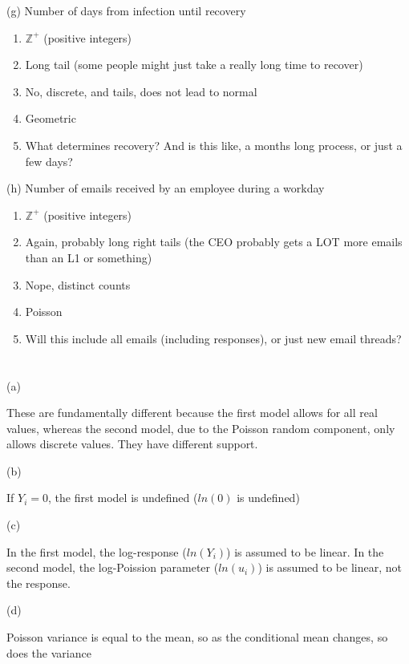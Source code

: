 \documentclass{article}
\begin{document}
(g) Number of days from infection until recovery

\begin{enumerate}
    \item $\mathbb{Z}^{+}$ (positive integers)
    \item Long tail (some people might just take a really long time to recover)
    \item No, discrete, and tails, does not lead to normal
    \item Geometric
    \item What determines recovery? And is this like, a months long process, or just a few days?
\end{enumerate}

(h) Number of emails received by an employee during a workday

\begin{enumerate}
    \item $\mathbb{Z}^{+}$ (positive integers)
    \item Again, probably long right tails (the CEO probably gets a LOT more emails than an L1 or something)
    \item Nope, distinct counts
    \item Poisson
    \item Will this include all emails (including responses), or just new email threads?
\end{enumerate}


\section{}

(a)

These are fundamentally different because the first model allows for all real values, whereas the second model, due to the Poisson random component, only allows discrete values. They have different support.

(b)

If $Y_i = 0$, the first model is undefined ($ln(0)$ is undefined)

(c)

In the first model, the log-response ($ln(Y_i)$) is assumed to be linear. In the second model, the log-Poission parameter ($ln(u_i)$) is assumed to be linear, not the response. 

(d)

Poisson variance is equal to the mean, so as the conditional mean changes, so does the variance
\end{document}
